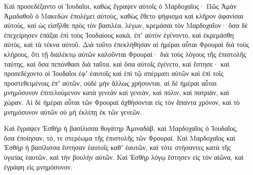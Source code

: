 {\par }{\PP {}Καὶ προσεδέξαντο οἱ Ἰουδαῖοι, καθὼς ἔγραψεν αὐτοῖς ὁ Μαρδοχαῖος·
Πῶς Ἀμὰν Ἀμαδαθοῦ ὁ Μακεδὼν ἐπολέμει αὐτοὺς, καθὼς ἔθετο ψήφισμα καὶ κλῆρον ἀφανίσαι αὐτοὺς,
καὶ ὡς εἰσῆλθε πρὸς τὸν βασιλέα, λέγων, κρεμάσαι τὸν Μαρδοχαῖον· ὅσα δὲ ἐπεχείρησεν ἐπάξαι ἐπὶ τοὺς Ἰουδαίους κακὰ, ἐπʼ αὐτὸν ἐγένοντο, καὶ ἐκρεμάσθη αὐτὸς, καὶ τὰ τέκνα αὐτοῦ.
Διὰ τοῦτο ἐπεκλήθησαν αἱ ἡμέραι αὗται Φρουραὶ διὰ τοὺς κλήρους, ὅτι τῇ διαλέκτῳ αὐτῶν καλοῦνται Φρουραί· διὰ τοὺς λόγους τῆς ἐπιστολῆς ταύτης, καὶ ὅσα πεπόνθασι διὰ ταῦτα, καὶ ὅσα αὐτοῖς ἐγένετο,
καὶ ἔστησε· καὶ προσεδέχοντο οἱ Ἰουδαῖοι ἐφʼ ἑαυτοῖς καὶ ἐπὶ τῷ σπέρματι αὐτῶν καὶ ἐπὶ τοῖς προστεθειμένοις ἐπʼ αὐτῶν, οὐδὲ μὴν ἄλλως χρήσονται. αἱ δὲ ἡμέραι αὗται μνημόσυνον ἐπιτελούμενον κατὰ γενεὰν καὶ γενεὰν, καὶ πόλιν, καὶ πατριὰν, καὶ χώραν.
Αἱ δὲ ἡμέραι αὗται τῶν Φρουραὶ ἀχθήσονται εἰς τὸν ἅπαντα χρόνον, καὶ τὸ μνημόσυνον αὐτῶν οὐ μὴ ἐκλίπῃ ἐκ τῶν γενεῶν.
\par }{\PP {}Καὶ ἔγραψεν Ἐσθὴρ ἡ βασίλισσα θυγάτηρ Ἀμιναδὰβ, καὶ Μαρδοχαῖος ὁ Ἰουδαῖος, ὅσα ἐποίησαν, τό, τε στερέωμα τῆς ἐπιστολῆς τῶν Φρουραί.
Καὶ Μαρδοχαῖος καὶ Ἐσθὴρ ἡ βασίλισσα ἔστησαν ἑαυτοῖς καθʼ ἑαυτῶν, καὶ τότε στήσαντες κατὰ τῆς ὑγιείας ἑαυτῶν, καὶ τὴν βουλὴν αὐτῶν.
Καὶ Ἐσθὴρ λόγῳ ἔστησεν εἰς τὸν αἰῶνα, καὶ ἐγράφη εἰς μνημόσυνον.

}
